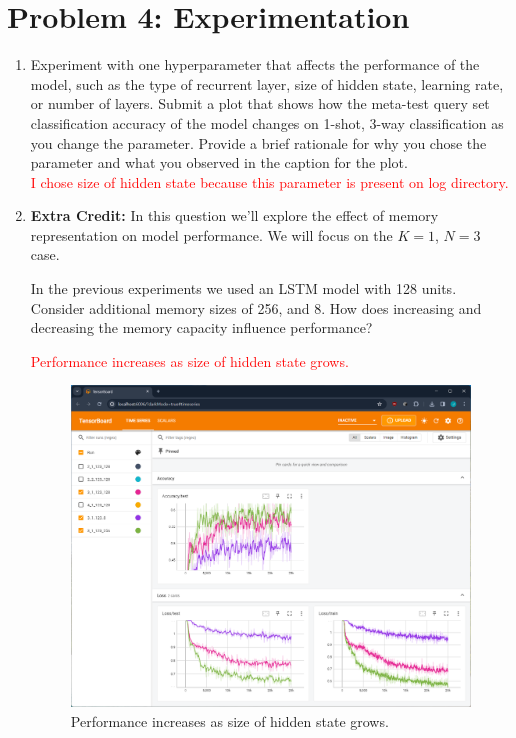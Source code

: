 \documentclass[12pt]{article}
\begin{document}
    \section*{Problem 4: Experimentation}
    \begin{enumerate}[label=\alph*]
        \item Experiment with one hyperparameter that affects the performance of the model, such as the type of recurrent layer, size of hidden state, learning rate, or number of layers. Submit a plot that shows how the meta-test query set classification accuracy of the model changes on 1-shot, 3-way classification as you change the parameter. Provide a brief rationale for why you chose the parameter and what you observed in the caption for the plot.\\
        \textcolor{red}{I chose size of hidden state because this parameter is present on log directory.}


        \item \textbf{Extra Credit:} In this question we'll explore the effect of memory representation on model performance. We will focus on the $K=1$, $N=3$ case.

        In the previous experiments we used an LSTM model with 128 units. Consider additional memory sizes of 256, and 8. How does increasing and decreasing the memory capacity influence performance?

        \textcolor{red}{Performance increases as size of hidden state grows.}

        \begin{figure}
            \centering
            \includegraphics[width=\linewidth]{figures/problem4.png}
            \caption{Performance increases as size of hidden state grows.}
        \end{figure}
    \end{enumerate}


    \newpage
    
    
\end{document}
